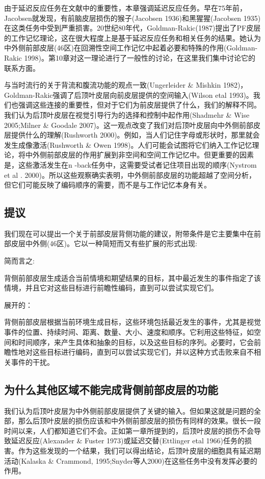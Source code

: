 由于延迟反应任务在文献中的重要性，本章强调延迟反应任务。早在75年前，Jacobsen就发现，有前脑皮层损伤的猴子(Jacobsen 1936)和黑猩猩(Jacobsen 1935)在这类任务中受到严重损害。20世纪80年代，Goldman-Rakic(1987)提出了PF皮层的工作记忆理论，这在很大程度上是基于延迟反应任务和相关任务的结果。她认为中外侧前部皮层(46区)在回溯性空间工作记忆中起着必要和特殊的作用(Goldman-Rakic 1998)。第10章对这一理论进行了一般性的讨论，在这里我们集中讨论它的联系方面。

与当时流行的关于背流和腹流功能的观点一致(Ungerleider \& Mishkin 1982)， Goldman-Rakic强调了后顶叶皮层向前皮层提供的空间输入(Wilson etal 1993)。我们也强调这些连接的重要性，但对于它们为前皮层提供了什么，我们的解释不同。我们认为后顶叶皮层在视觉引导行为的选择和控制中起作用(Shadmehr \& Wise 2005;Milner \& Goodale 2007)。这一观点改变了我们对后顶叶皮层向中外侧前部皮层提供什么的理解(Rushworth 2000)。例如，当人们记住字母或形状时，那里就会发生成像激活(Rushworth \& Owen 1998)。人们可能会试图将它们纳入工作记忆理论，将中外侧前部皮层的作用扩展到非空间和空间工作记忆中。但更重要的因素是，这些激活发生在n -back任务中，这需要受试者记住项目出现的顺序(Nystrom et al . 2000)。所以这些观察确实表明，中外侧前部皮层的功能超越了空间分析，但它们可能反映了编码顺序的需要，而不是与工作记忆本身有关。

\subsection{提议}
我们现在可以提出一个关于前部皮层背侧功能的建议，附带条件是它主要集中在前部皮层中外侧(46区)。它以一种简短而又有些扩展的形式出现:

简而言之:

背侧前部皮层生成适合当前情境和期望结果的目标，其中最近发生的事件指定了该情境，并且它对这些目标进行前瞻性编码，直到可以尝试实现它们。

展开的：

背侧前部皮层根据当前环境生成目标，这些环境包括最近发生的事件，尤其是视觉事件的位置、持续时间、距离、数量、大小、速度和顺序。它利用这些特征，如空间和时间顺序，来产生具体和抽象的目标，以及这些目标的序列。必要时，它会前瞻性地对这些目标进行编码，直到可以尝试实现它们，并以这种方式击败来自不相关事件的干扰。

\subsection{为什么其他区域不能完成背侧前部皮层的功能}
我们认为后顶叶皮层为中外侧前部皮层提供了关键的输入。但如果这就是问题的全部，那么后顶叶皮层的损伤应该和中外侧前部皮层的损伤有同样的效果。很长一段时间以来，人们都知道它们不会。正如第一章所提到的，后顶叶皮层的损伤不会导致延迟反应(Alexander \& Fuster 1973)或延迟交替(Ettlinger etal 1966)任务的损害。作为这些发现的一个结果，我们可以得出结论，后顶叶皮层的细胞具有延迟期活动(Kalaska \& Crammond, 1995;Snyder等人2000)在这些任务中没有发挥必要的作用。

